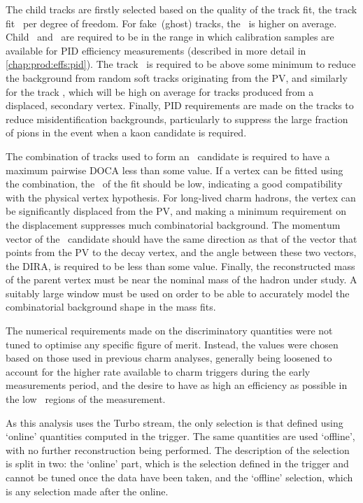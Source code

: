 The child tracks are firstly selected based on the quality of the track fit, 
the track fit \chisq\ per degree of freedom.
For fake~(ghost) tracks, the \chisq\ is higher on average.
Child \ptot\ and \Eta\ are required to be in the range in which calibration 
samples are available for \ac{PID} efficiency measurements (described in more 
detail in \cref{chap:prod:effs:pid}).
The track \pT\ is required to be above some minimum to reduce the background 
from random soft tracks originating from the \ac{PV}, and similarly for the 
track \ipchisq, which will be high on average for tracks produced from a 
displaced, secondary vertex.
Finally, \ac{PID} requirements are made on the tracks to reduce 
misidentification backgrounds, particularly to suppress the large fraction of 
pions in the event when a kaon candidate is required.

The combination of tracks used to form an \PHc\ candidate is required to have a 
maximum pairwise \ac{DOCA} less than some value.
If a vertex can be fitted using the combination, the \chisq\ of the fit should 
be low, indicating a good compatibility with the physical vertex hypothesis.
For long-lived charm hadrons, the vertex can be significantly displaced from 
the \ac{PV}, and making a minimum requirement on the displacement suppresses 
much combinatorial background.
The momentum vector of the \PHc\ candidate should have the same direction as 
that of the vector that points from the \ac{PV} to the decay vertex, and the 
angle between these two vectors, the \ac{DIRA}, is required to be less than 
some value.
Finally, the reconstructed mass of the parent vertex must be near the nominal 
mass of the hadron under study.
A suitably large window must be used on order to be able to accurately model 
the combinatorial background shape in the mass fits.

The numerical requirements made on the discriminatory quantities were not tuned 
to optimise any specific figure of merit.
Instead, the values were chosen based on those used in previous charm analyses, 
generally being loosened to account for the higher rate available to charm 
triggers during the early measurements period, and the desire to have as high 
an efficiency as possible in the low \pT\ regions of the measurement.

As this analysis uses the Turbo stream, the only selection is that defined 
using `online' quantities computed in the trigger.
The same quantities are used `offline', with no further reconstruction being 
performed.
The description of the selection is split in two: the `online' part, which is 
the selection defined in the trigger and cannot be tuned once the data have 
been taken, and the `offline' selection, which is any selection made after the 
online.

